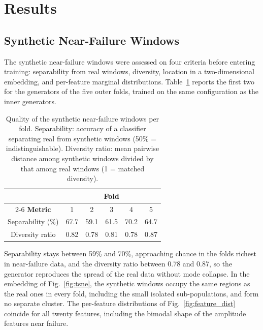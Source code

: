 
\section{Results}
\label{sec:results}

\subsection{Synthetic Near-Failure Windows}
\label{sec:res_gan}

The synthetic near-failure windows were assessed on four criteria
before entering training: separability from real windows, diversity,
location in a two-dimensional embedding, and per-feature marginal
distributions. Table~\ref{tab:gan_quality} reports the first two for
the generators of the five outer folds, trained on the same
configuration as the inner generators.

\begin{table}[htbp]
\centering
\caption{Quality of the synthetic near-failure windows per fold.
Separability: accuracy of a classifier separating real from synthetic
windows (50\% = indistinguishable). Diversity ratio: mean pairwise
distance among synthetic windows divided by that among real windows
(1 = matched diversity).}
\label{tab:gan_quality}
\footnotesize
\renewcommand{\arraystretch}{1.2}
\begin{tabular}{cccccc}
\toprule
& \multicolumn{5}{c}{\textbf{Fold}} \\
\cmidrule(lr){2-6}
\textbf{Metric} & 1 & 2 & 3 & 4 & 5 \\
\midrule
Separability (\%) & 67.7 & 59.1 & 61.5 & 70.2 & 64.7 \\
Diversity ratio   & 0.82 & 0.78 & 0.81 & 0.78 & 0.87 \\
\bottomrule
\end{tabular}
\end{table}

Separability stays between 59\% and 70\%, approaching chance in the
folds richest in near-failure data, and the diversity ratio between
0.78 and 0.87, so the generator reproduces the spread of the real data
without mode collapse. In the embedding of Fig.~\ref{fig:tsne}, the
synthetic windows occupy the same regions as the real ones in every
fold, including the small isolated sub-populations, and form no
separate cluster. The per-feature distributions of
Fig.~\ref{fig:feature_dist} coincide for all twenty features,
including the bimodal shape of the amplitude features near failure.

